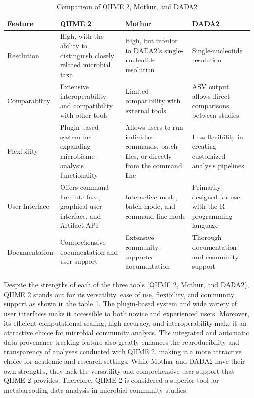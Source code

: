                 \begin{table}[H]
                    \centering
                    \begin{tabular}{|l|p{3cm}|p{3cm}|p{3cm}|}
                    \hline
                    \textbf{Feature} & \textbf{QIIME 2} & \textbf{Mothur} & \textbf{DADA2} \\
                    \hline
                    Resolution & High, with the ability to distinguish closely related microbial taxa & High, but inferior to DADA2's single-nucleotide resolution & Single-nucleotide resolution \\
                    \hline
                    Comparability & Extensive interoperability and compatibility with other tools & Limited compatibility with external tools & ASV output allows direct comparisons between studies \\
                    \hline
                    Flexibility & Plugin-based system for expanding microbiome analysis functionality & Allows users to run individual commands, batch files, or directly from the command line & Less flexibility in creating customized analysis pipelines \\
                    \hline
                    User Interface & Offers command line interface, graphical user interface, and Artifact API & Interactive mode, batch mode, and command line mode & Primarily designed for use with the R programming language \\
                    \hline
                    Documentation & Comprehensive documentation and user support & Extensive community-supported documentation & Thorough documentation and community support \\
                    \hline
                    \end{tabular}
                    \caption{Comparison of QIIME 2, Mothur, and DADA2}
                    \label{metabarcoding_tools}
                \end{table}


            Despite the strengths of each of the three tools (QIIME 2, Mothur, and DADA2), QIIME 2 stands out for its versatility, ease of use, flexibility, and community support as shown in the table \ref{metabarcoding_tools}. The plugin-based system and wide variety of user interfaces make it accessible to both novice and experienced users. Moreover, its efficient computational scaling, high accuracy, and interoperability make it an attractive choice for microbial community analysis. The integrated and automatic data provenance tracking feature also greatly enhances the reproducibility and transparency of analyses conducted with QIIME 2, making it a more attractive choice for academic and research settings. While Mothur and DADA2 have their own strengths, they lack the versatility and comprehensive user support that QIIME 2 provides. Therefore, QIIME 2 is considered a superior tool for metabarcoding data analysis in microbial community studies.

